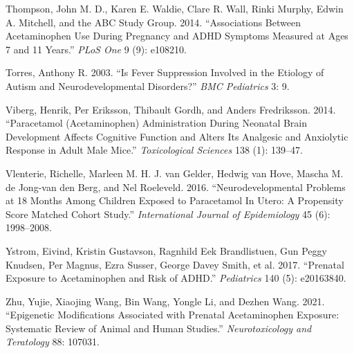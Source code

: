 \documentclass[12pt]{article}
\begin{document}
\begin{thebibliography}{99}
Thompson, John M. D., Karen E. Waldie, Clare R. Wall, Rinki Murphy, Edwin A. Mitchell, and the ABC Study Group. 2014. ``Associations Between Acetaminophen Use During Pregnancy and ADHD Symptoms Measured at Ages 7 and 11 Years.'' \textit{PLoS One} 9 (9): e108210.

Torres, Anthony R. 2003. ``Is Fever Suppression Involved in the Etiology of Autism and Neurodevelopmental Disorders?'' \textit{BMC Pediatrics} 3: 9.

Viberg, Henrik, Per Eriksson, Thibault Gordh, and Anders Fredriksson. 2014. ``Paracetamol (Acetaminophen) Administration During Neonatal Brain Development Affects Cognitive Function and Alters Its Analgesic and Anxiolytic Response in Adult Male Mice.'' \textit{Toxicological Sciences} 138 (1): 139--47.

Vlenterie, Richelle, Marleen M. H. J. van Gelder, Hedwig van Hove, Mascha M. de Jong-van den Berg, and Nel Roeleveld. 2016. ``Neurodevelopmental Problems at 18 Months Among Children Exposed to Paracetamol In Utero: A Propensity Score Matched Cohort Study.'' \textit{International Journal of Epidemiology} 45 (6): 1998--2008.

Ystrom, Eivind, Kristin Gustavson, Ragnhild Eek Brandlistuen, Gun Peggy Knudsen, Per Magnus, Ezra Susser, George Davey Smith, et al. 2017. ``Prenatal Exposure to Acetaminophen and Risk of ADHD.'' \textit{Pediatrics} 140 (5): e20163840.

Zhu, Yujie, Xiaojing Wang, Bin Wang, Yongle Li, and Dezhen Wang. 2021. ``Epigenetic Modifications Associated with Prenatal Acetaminophen Exposure: Systematic Review of Animal and Human Studies.'' \textit{Neurotoxicology and Teratology} 88: 107031.

\end{thebibliography}
\end{document}
